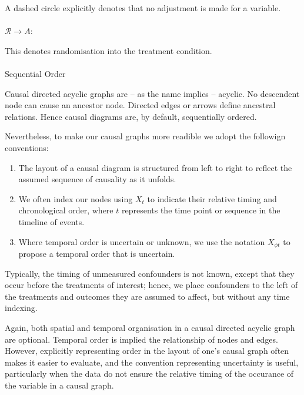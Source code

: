 \documentclass[
  single column]{article}
\makeatletter
\let\oldparagraph\paragraph
\renewcommand{\paragraph}{
    \@ifstar
      \xxxParagraphStar
      \xxxParagraphNoStar
  }
\newcommand{\xxxParagraphStar}[1]{\oldparagraph*{#1}\mbox{}}
\newcommand{\xxxParagraphNoStar}[1]{\oldparagraph{#1}\mbox{}}
\providecommand{\tightlist}{%
  \setlength{\itemsep}{0pt}\setlength{\parskip}{0pt}}\usepackage{longtable,booktabs,array}
\makeatother
\begin{document}
A dashed circle explicitly denotes that no adjustment is made for a
variable.

\paragraph{\texorpdfstring{\(\mathcal{R} \rightarrow A\):}{\textbackslash mathcal\{R\} \textbackslash rightarrow A:}}\label{mathcalr-rightarrow-a}

This denotes randomisation into the treatment condition.

\paragraph{Sequential Order}\label{sequential-order}

Causal directed acyclic graphs are -- as the name implies -- acyclic. No
descendent node can cause an ancestor node. Directed edges or arrows
define ancestral relations. Hence causal diagrams are, by default,
sequentially ordered.

Nevertheless, to make our causal graphs more readible we adopt the
followign conventions:

\begin{enumerate}
\def\labelenumi{\arabic{enumi}.}
\tightlist
\item
  The layout of a causal diagram is structured from left to right to
  reflect the assumed sequence of causality as it unfolds.
\item
  We often index our nodes using \(X_t\) to indicate their relative
  timing and chronological order, where \(t\) represents the time point
  or sequence in the timeline of events.
\item
  Where temporal order is uncertain or unknown, we use the notation
  \(X_{\phi t}\) to propose a temporal order that is uncertain.
\end{enumerate}

Typically, the timing of unmeasured confounders is not known, except
that they occur before the treatments of interest; hence, we place
confounders to the left of the treatments and outcomes they are assumed
to affect, but without any time indexing.

Again, both spatial and temporal organisation in a causal directed
acyclic graph are optional. Temporal order is implied the relationship
of nodes and edges. However, explicitly representing order in the layout
of one's causal graph often makes it easier to evaluate, and the
convention representing uncertainty is useful, particularly when the
data do not ensure the relative timing of the occurance of the variable
in a causal graph.
\end{document}
